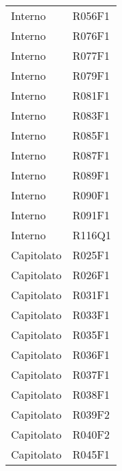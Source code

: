 \documentclass[../analisi-dei-requisiti.tex]{subfiles}
\begin{document}
\begin{longtable}[H]{ p{4cm} | p{4cm} }
  Interno                       & R056F1                               \\
  Interno                       & R076F1                               \\
  Interno                       & R077F1                               \\
  Interno                       & R079F1                               \\
  Interno                       & R081F1                               \\
  Interno                       & R083F1                               \\
  Interno                       & R085F1                               \\
  Interno                       & R087F1                               \\
  Interno                       & R089F1                               \\
  Interno                       & R090F1                               \\
  Interno                       & R091F1                               \\
  Interno                       & R116Q1                               \\
  Capitolato                    & R025F1                               \\
  Capitolato                    & R026F1                               \\
  Capitolato                    & R031F1                               \\
  Capitolato                    & R033F1                               \\
  Capitolato                    & R035F1                               \\
  Capitolato                    & R036F1                               \\
  Capitolato                    & R037F1                               \\
  Capitolato                    & R038F1                               \\
  Capitolato                    & R039F2                               \\
  Capitolato                    & R040F2                               \\
  Capitolato                    & R045F1                               \\

\end{longtable}
\end{document}
